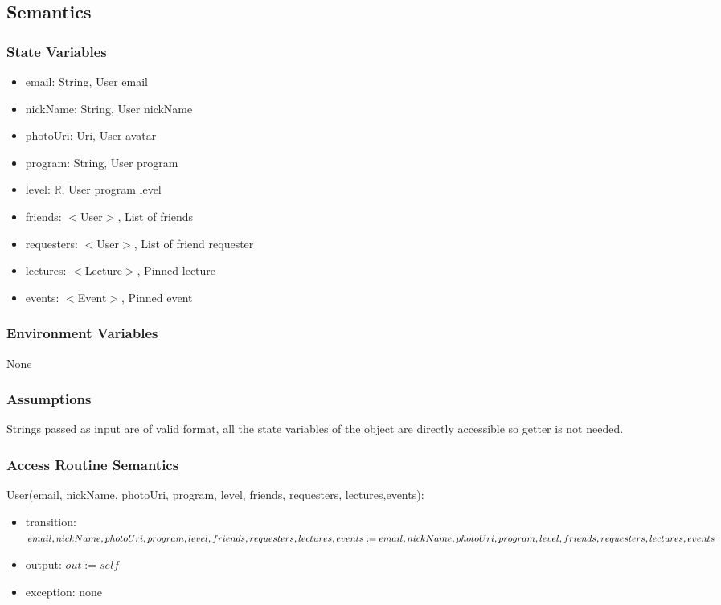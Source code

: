 \documentclass[12pt, titlepage]{article}
\begin{document}
\subsection{Semantics}

\subsubsection{State Variables}

\begin{itemize}
\item email: String, User email
\item nickName: String, User nickName
\item photoUri: Uri, User avatar
\item program: String, User program
\item level: $\mathbb{R}$, User program level
\item friends: $<$User$>$, List of friends
\item requesters: $<$User$>$, List of friend requester
\item lectures: $<$Lecture$>$, Pinned lecture
\item events: $<$Event$>$, Pinned event
\end{itemize}

\subsubsection{Environment Variables}

None

\subsubsection{Assumptions}

Strings passed as input are of valid format, all the state variables of the object are directly accessible so getter is not needed.

\subsubsection{Access Routine Semantics}

\noindent User(email, nickName, photoUri, program, level, friends, requesters, lectures,events):
\begin{itemize}
\item transition: $email, nickName, photoUri, program, level, friends, requesters, lectures, events := \\ email, nickName, photoUri, program, level, friends, requesters, lectures, events$
\item output: $out := self$
\item exception: none
\end{itemize}
\end{document}
